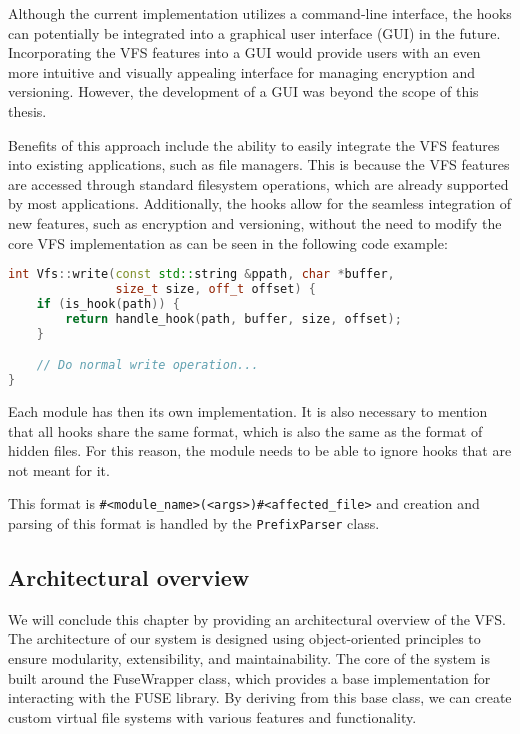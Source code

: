 Although the current implementation utilizes a command-line interface, the hooks can potentially be integrated into a graphical user interface (GUI) in the future.
Incorporating the VFS features into a GUI would provide users with an even more intuitive and visually appealing interface for managing encryption and versioning.
However, the development of a GUI was beyond the scope of this thesis.

Benefits of this approach include the ability to easily integrate the VFS features into existing applications, such as file managers.
This is because the VFS features are accessed through standard filesystem operations, which are already supported by most applications.
Additionally, the hooks allow for the seamless integration of new features, such as encryption and versioning, without the need to modify the core VFS implementation as can be seen in the following code example:

\begin{lstlisting}[language=c++, caption={Example of hook implementation}, basicstyle=\ttfamily\small]
int Vfs::write(const std::string &ppath, char *buffer,
               size_t size, off_t offset) {
    if (is_hook(path)) {
        return handle_hook(path, buffer, size, offset);
    }

    // Do normal write operation...
}
\end{lstlisting}

Each module has then its own implementation.
It is also necessary to mention that all hooks share the same format, which is also the same as the format of hidden files.
For this reason, the module needs to be able to ignore hooks that are not meant for it.

This format is \texttt{\#<module\_name>\-(<args>)\#<affected\_file>} and creation and parsing of this format is handled by the \texttt{PrefixParser} class.

\subsection{Architectural overview}\label{subsec:overview}

We will conclude this chapter by providing an architectural overview of the VFS\@.
The architecture of our system is designed using object-oriented principles to ensure modularity, extensibility, and maintainability.
The core of the system is built around the FuseWrapper class, which provides a base implementation for interacting with the FUSE library.
By deriving from this base class, we can create custom virtual file systems with various features and functionality.


